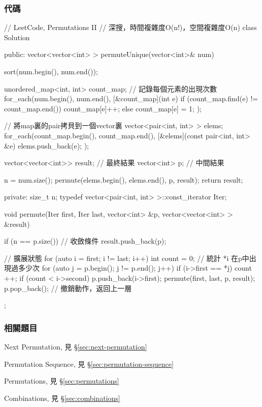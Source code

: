 \subsubsection{代碼}
\begin{Code}
// LeetCode, Permutations II
// 深搜，時間複雜度O(n!)，空間複雜度O(n)
class Solution {
public:
    vector<vector<int> > permuteUnique(vector<int>& num) {
        sort(num.begin(), num.end());

        unordered_map<int, int> count_map; // 記錄每個元素的出現次數
        for_each(num.begin(), num.end(), [&count_map](int e) {
            if (count_map.find(e) != count_map.end())
                count_map[e]++;
            else
                count_map[e] = 1;
        });

        // 將map裏的pair拷貝到一個vector裏
        vector<pair<int, int> > elems;
        for_each(count_map.begin(), count_map.end(),
                [&elems](const pair<int, int> &e) {
                    elems.push_back(e);
                });

        vector<vector<int>> result; // 最終結果
        vector<int> p;  // 中間結果

        n = num.size();
        permute(elems.begin(), elems.end(), p, result);
        return result;
    }

private:
    size_t n;
    typedef vector<pair<int, int> >::const_iterator Iter;

    void permute(Iter first, Iter last, vector<int> &p,
            vector<vector<int> > &result) {
        if (n == p.size()) {  // 收斂條件
            result.push_back(p);
        }

        // 擴展狀態
        for (auto i = first; i != last; i++) {
            int count = 0; // 統計 *i 在p中出現過多少次
            for (auto j = p.begin(); j != p.end(); j++) {
                if (i->first == *j) {
                    count ++;
                }
            }
            if (count < i->second) {
                p.push_back(i->first);
                permute(first, last, p, result);
                p.pop_back(); // 撤銷動作，返回上一層
            }
        }
    }
};
\end{Code}


\subsubsection{相關題目}
\begindot
\item Next Permutation, 見 \S \ref{sec:next-permutation}
\item Permutation Sequence, 見 \S \ref{sec:permutation-sequence}
\item Permutations, 見 \S \ref{sec:permutations}
\item Combinations, 見 \S \ref{sec:combinations}
\myenddot



